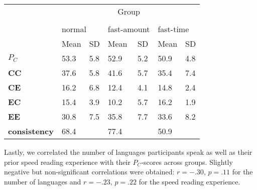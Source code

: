 \begin{center}
\begin{table}[h]
\begin{tabular}{>{\bfseries}lllllll}
\hline
& \multicolumn{6}{c}{Group}\\
\cline{2-7}                                                                    \\
 & \multicolumn{2}{l}{normal} & \multicolumn{2}{l}{fast-amount} & \multicolumn{2}{l}{fast-time} \\
 \cline{2-3} \cline{4-5} \cline{6-7}
 		& Mean          & SD         & Mean            & SD            & Mean            & SD      \\
$P_{C}$ &  53.3         & 5.8        & 52.9            & 5.2           & 50.9            & 4.8  \\
CC		&  37.6 	    & 5.8        & 41.6            & 5.7           & 35.4            & 7.4  \\
CE 		&  16.2         & 6.8        & 12.4            & 4.1           & 14.8            & 2.4    \\
EC		&  15.4	   		& 3.9        & 10.2            & 5.7           & 16.2          	 & 1.9    \\
EE		&  30.8         & 7.5        & 35.8            & 7.7           & 33.6            & 8.2  \\
consistency &  68.4     &            & 77.4        	   &           	   & 50.9            &     \\
\end{tabular}
\end{table}
\end{center}
Lastly, we correlated the number of languages participants speak as well as their prior speed reading experience with their $P_C$-scores across groups. Slightly negative but non-significant correlations were obtained: $r=-.30$, $p=.11$ for the number of languages and $r=-.23$, $p=.22$ for the speed reading experience.